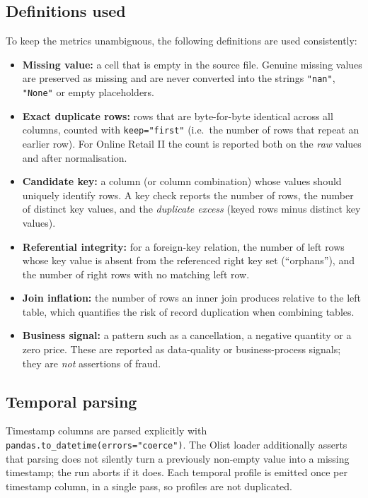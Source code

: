 \documentclass[11pt,a4paper]{article}
\newcommand{\code}[1]{\texttt{#1}}
\begin{document}
\subsection{Definitions used}
To keep the metrics unambiguous, the following definitions are used consistently:
\begin{itemize}
\item \textbf{Missing value:} a cell that is empty in the source file. Genuine missing values are preserved as missing and are never converted into the strings \code{"nan"}, \code{"None"} or empty placeholders.
\item \textbf{Exact duplicate rows:} rows that are byte-for-byte identical across all columns, counted with \code{keep="first"} (i.e.\ the number of rows that repeat an earlier row). For Online Retail II the count is reported both on the \emph{raw} values and after normalisation.
\item \textbf{Candidate key:} a column (or column combination) whose values should uniquely identify rows. A key check reports the number of rows, the number of distinct key values, and the \emph{duplicate excess} (keyed rows minus distinct key values).
\item \textbf{Referential integrity:} for a foreign-key relation, the number of left rows whose key value is absent from the referenced right key set (``orphans''), and the number of right rows with no matching left row.
\item \textbf{Join inflation:} the number of rows an inner join produces relative to the left table, which quantifies the risk of record duplication when combining tables.
\item \textbf{Business signal:} a pattern such as a cancellation, a negative quantity or a zero price. These are reported as data-quality or business-process signals; they are \emph{not} assertions of fraud.
\end{itemize}

\subsection{Temporal parsing}
Timestamp columns are parsed explicitly with \code{pandas.to\_datetime(errors="coerce")}. The Olist loader additionally asserts that parsing does not silently turn a previously non-empty value into a missing timestamp; the run aborts if it does. Each temporal profile is emitted once per timestamp column, in a single pass, so profiles are not duplicated.

\end{document}
